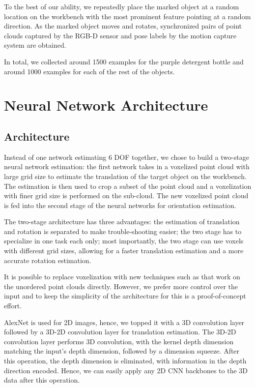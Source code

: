 \documentclass[conference]{IEEEtran}
\begin{document}
To the best of our ability, we repeatedly place the marked object at a random location on the workbench with the most prominent feature pointing at a random direction. As the marked object moves and rotates, synchronized pairs of point clouds captured by the RGB-D sensor and pose labels by the motion capture system are obtained.

In total, we collected around 1500 examples for the purple detergent bottle and around 1000 examples for each of the rest of the objects.


\section{Neural Network Architecture}
\subsection{Architecture}
Instead of one network estimating 6 DOF together, we chose to build a two-stage neural network estimation: the first network takes in a voxelized point cloud with large grid size to estimate the translation of the target object on the workbench. The estimation is then used to crop a subset of the point cloud and a voxelization with finer grid size is performed on the sub-cloud. The new voxelized point cloud is fed into the second stage of the neural networks for orientation estimation.

The two-stage architecture has three advantages: the estimation of translation and rotation is separated to make trouble-shooting easier; the two stage has to specialize in one task each only; most importantly, the two stage can use voxels with different grid sizes, allowing for a faster translation estimation and a more accurate rotation estimation.

It is possible to replace voxelization with new techniques such as \cite{qi_2018_cvpr} that work on the unordered point clouds directly. However, we prefer more control over the input and to keep the simplicity of the architecture for this is a proof-of-concept effort.

AlexNet is used for 2D images, hence, we topped it with a 3D convolution layer followed by a 3D-2D convolution layer for translation estimation. The 3D-2D convolution layer performs 3D convolution, with the kernel depth dimension matching the input's depth dimension, followed by a dimension squeeze. After this operation, the depth dimension is eliminated, with information in the depth direction encoded. Hence, we can easily apply any 2D CNN backbones to the 3D data after this operation.
\end{document}
